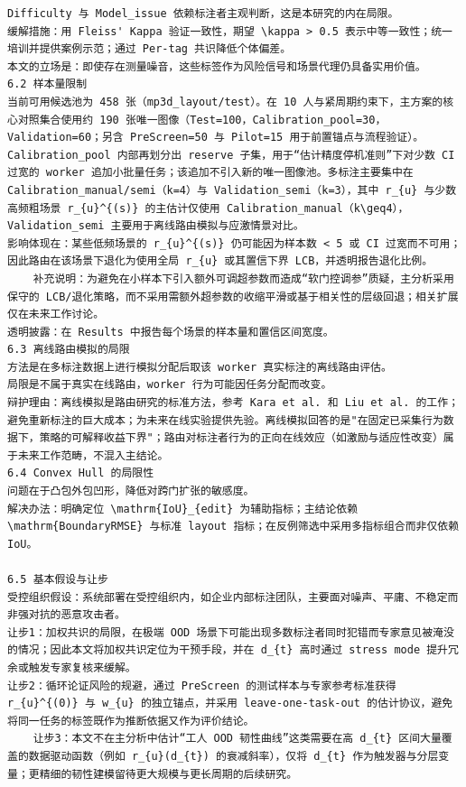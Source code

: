 \documentclass[a4paper,12pt]{article}
\begin{document}
\begin{Verbatim}[fontsize=\small,breaklines=true,breakanywhere=true]
Difficulty 与 Model_issue 依赖标注者主观判断，这是本研究的内在局限。
缓解措施：用 Fleiss' Kappa 验证一致性，期望 \kappa > 0.5 表示中等一致性；统一培训并提供案例示范；通过 Per-tag 共识降低个体偏差。
本文的立场是：即使存在测量噪音，这些标签作为风险信号和场景代理仍具备实用价值。
6.2 样本量限制
当前可用候选池为 458 张（mp3d_layout/test）。在 10 人与紧周期约束下，主方案的核心对照集合使用约 190 张唯一图像（Test=100，Calibration_pool=30，Validation=60；另含 PreScreen=50 与 Pilot=15 用于前置锚点与流程验证）。Calibration_pool 内部再划分出 reserve 子集，用于“估计精度停机准则”下对少数 CI 过宽的 worker 追加小批量任务；该追加不引入新的唯一图像池。多标注主要集中在 Calibration_manual/semi（k=4）与 Validation_semi（k=3），其中 r_{u} 与少数高频粗场景 r_{u}^{(s)} 的主估计仅使用 Calibration_manual（k\geq4），Validation_semi 主要用于离线路由模拟与应激情景对比。
影响体现在：某些低频场景的 r_{u}^{(s)} 仍可能因为样本数 < 5 或 CI 过宽而不可用；因此路由在该场景下退化为使用全局 r_{u} 或其置信下界 LCB，并透明报告退化比例。
	补充说明：为避免在小样本下引入额外可调超参数而造成“软门控调参”质疑，主分析采用保守的 LCB/退化策略，而不采用需额外超参数的收缩平滑或基于相关性的层级回退；相关扩展仅在未来工作讨论。
透明披露：在 Results 中报告每个场景的样本量和置信区间宽度。
6.3 离线路由模拟的局限
方法是在多标注数据上进行模拟分配后取该 worker 真实标注的离线路由评估。
局限是不属于真实在线路由，worker 行为可能因任务分配而改变。
辩护理由：离线模拟是路由研究的标准方法，参考 Kara et al. 和 Liu et al. 的工作；避免重新标注的巨大成本；为未来在线实验提供先验。离线模拟回答的是"在固定已采集行为数据下，策略的可解释收益下界"；路由对标注者行为的正向在线效应（如激励与适应性改变）属于未来工作范畴，不混入主结论。
6.4 Convex Hull 的局限性
问题在于凸包外包凹形，降低对跨门扩张的敏感度。
解决办法：明确定位 \mathrm{IoU}_{edit} 为辅助指标；主结论依赖 \mathrm{BoundaryRMSE} 与标准 layout 指标；在反例筛选中采用多指标组合而非仅依赖 IoU。

6.5 基本假设与让步
受控组织假设：系统部署在受控组织内，如企业内部标注团队，主要面对噪声、平庸、不稳定而非强对抗的恶意攻击者。
让步1：加权共识的局限，在极端 OOD 场景下可能出现多数标注者同时犯错而专家意见被淹没的情况；因此本文将加权共识定位为干预手段，并在 d_{t} 高时通过 stress mode 提升冗余或触发专家复核来缓解。
让步2：循环论证风险的规避，通过 PreScreen 的测试样本与专家参考标准获得 r_{u}^{(0)} 与 w_{u} 的独立锚点，并采用 leave-one-task-out 的估计协议，避免将同一任务的标签既作为推断依据又作为评价结论。
	让步3：本文不在主分析中估计“工人 OOD 韧性曲线”这类需要在高 d_{t} 区间大量覆盖的数据驱动函数（例如 r_{u}(d_{t}) 的衰减斜率），仅将 d_{t} 作为触发器与分层变量；更精细的韧性建模留待更大规模与更长周期的后续研究。


\end{Verbatim}
\end{document}
